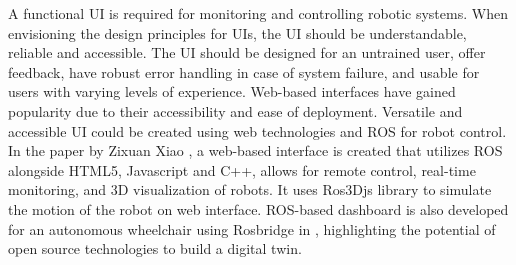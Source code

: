 A functional UI is required for monitoring and controlling robotic systems. When envisioning the design principles for UIs, the UI should be understandable, reliable and accessible. \cite{Wilkinson}
The UI should be designed for an untrained user, offer feedback, have robust error handling in case of system failure, and usable for users with varying levels of experience. Web-based interfaces have gained popularity due to their accessibility and ease of deployment.
Versatile and accessible UI could be created using web technologies and ROS for robot control.
In the paper by Zixuan Xiao \cite{Xiao_2019}, a web-based interface is created that utilizes ROS alongside HTML5, Javascript and C++, allows for remote control, real-time monitoring, and 3D visualization of robots.
It uses Ros3Djs library to simulate the motion of the robot on web interface. ROS-based dashboard is also developed for an autonomous wheelchair using Rosbridge in \cite{10070046}, highlighting the potential of open source technologies to build a digital twin.

